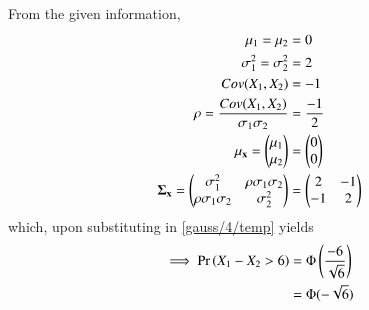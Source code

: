    From the given information,
   \begin{align}
    \mu_1=\mu_2&=0\\
    \sigma^2_1=\sigma^2_2&=2\\
    Cov(X_1,X_2)&=-1\\
    \rho=\frac{Cov(X_1,X_2)}{\sigma_1\sigma_2}&=\frac{-1}{2}\\
    \mathbf{\mu_{\mathbf{x}}}=\begin{pmatrix}\mu_1\\
                                    \mu_2\end{pmatrix}&=\begin{pmatrix}0\\
                                                  0\end{pmatrix}\\
     \mathbf{\Sigma_{\mathbf{x}}}=\begin{pmatrix}\sigma_1^2&\rho\sigma_1\sigma_2\\
                                        \rho\sigma_1\sigma_2&\sigma_2^2\end{pmatrix}&=\begin{pmatrix}2&-1\\
                                                                                -1&2\end{pmatrix}
\end{align}
which, upon substituting in        \eqref{gauss/4/temp} yields 
\begin{align}
    \implies \Pr\left(X_1-X_2>6\right)&=\Phi\left(\frac{-6}{\sqrt{6}}\right)\\
    &=\Phi(-\sqrt{6})
\end{align}
